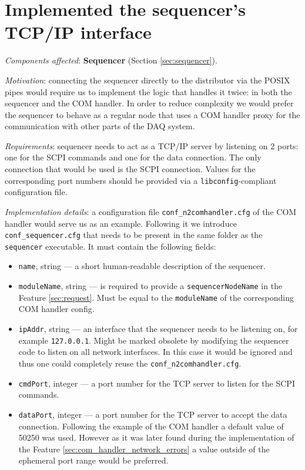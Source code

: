 \section{Implemented the sequencer's TCP/IP interface}
\label{sec:tcp_ip_sequencer}

\textit{Components affected}: \textbf{Sequencer} (Section \ref{sec:sequencer}).

\textit{Motivation}: connecting the sequencer directly to the distributor via the POSIX pipes would require us to implement the logic that handles it twice: in both the sequencer and the COM handler. In order to reduce complexity we would prefer the sequencer to behave as a regular node that uses a COM handler proxy for the communication with other parts of the DAQ system.

\textit{Requirements}: sequencer needs to act as a TCP/IP server by listening on 2 ports: one for the SCPI commands and one for the data connection. The only connection that would be used is the SCPI connection. Values for the corresponding port numbers should be provided via a \texttt{libconfig}-compliant configuration file.

\textit{Implementation details}: a configuration file \texttt{conf\_n2comhandler.cfg} of the COM handler would serve us as an example. Following it we introduce \texttt{conf\_sequencer.cfg} that needs to be present in the same folder as the \texttt{sequencer} executable. It must contain the following fields:

\begin{itemize}
	\item \texttt{name}, string --- a short human-readable description of the sequencer.
	\item \texttt{moduleName}, string --- is required to provide a \texttt{sequencerNodeName} in the Feature \ref{sec:request}. Must be equal to the \texttt{moduleName} of the corresponding COM handler config.
	\item \texttt{ipAddr}, string --- an interface that the sequencer needs to be listening on, for example \texttt{127.0.0.1}. Might be marked obsolete by modifying the sequencer code to listen on all network interfaces. In this case it would be ignored and thus one could completely reuse the \texttt{conf\_n2comhandler.cfg}.
	\item \texttt{cmdPort}, integer --- a port number for the TCP server to listen for the SCPI commands.
	\item \texttt{dataPort}, integer --- a port number for the TCP server to accept the data connection. Following the example of the COM handler a default value of 50250 was used. However as it was later found during the implementation of the Feature \ref{sec:com_handler_network_errors} a value outside of the ephemeral port range would be preferred.
\end{itemize}

